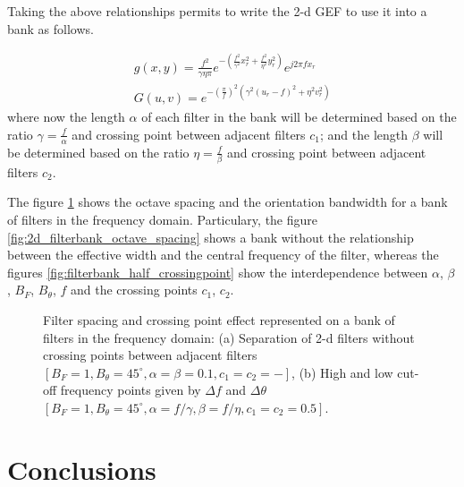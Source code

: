 Taking the above relationships permits to write the 2-d GEF to use it into a bank as follows. 

\begin{equation}\label{eq:gabor_function_2d_spacefreq_bank}
    \begin{gathered}
         g(x,y) =  \frac{f^2}{\gamma \eta \pi} e ^{-\left(\frac{f^2}{\gamma^2} x_r^2 + \frac{f^2}{\eta^2} y_r^2\right)} e ^{j 2 \pi f x_r } \\
         G(u,v) =  e ^{-\left(\frac{\pi}{f}\right)^2\left( \gamma^2 (u_r-f)^2 + \eta^2 v_r^2\right)}
     \end{gathered}
\end{equation}
where now the length $\alpha$ of each filter in the bank will be determined based on the ratio $\gamma = \frac{f}{\alpha}$ and crossing point between adjacent filters $c_1$; and the length $\beta$ will be determined based on the ratio $\eta = \frac{f}{\beta}$ and crossing point between adjacent filters $c_2$.

The figure \ref{fig:2d_filterbank_spacing} shows the octave spacing and the orientation bandwidth for a bank of filters in the frequency domain. Particulary, the figure \ref{fig:2d_filterbank_octave_spacing} shows a bank without the relationship between the effective width and the central frequency of the filter, whereas the figures \ref{fig:filterbank_half_crossingpoint} show the interdependence between $\alpha$, $\beta$, $B_F$, $B_{\theta}$, $f$ and the crossing points $c_1$, $c_2$.

\begin{figure}[!ht]
\centering
\caption{Filter spacing and crossing point effect represented on a bank of filters in the frequency domain: (a) Separation of 2-d filters without crossing points between adjacent filters $[B_F=1, B_{\theta} = 45^{\circ}, \alpha=\beta=0.1, c_1=c_2=-]$, (b) High and low cut-off frequency points given by $\Delta f$ and $\Delta \theta$ $[B_F=1, B_{\theta} = 45^{\circ}, \alpha=f/\gamma, \beta=f/\eta, c_1=c_2=0.5]$.}\label{fig:2d_filterbank_spacing}
\end{figure}

\section{Conclusions}